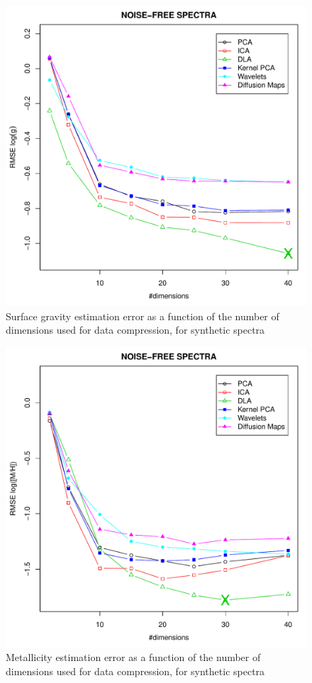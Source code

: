 \documentclass[a4paper,fleqn,usenatbib]{mnras}
\begin{document}
{{{\begin{figure}
\centering\includegraphics[width=\columnwidth]{flamesHR10_SNR=000_Logg_log_BestSVM_N-RMSE_test.pdf}
\caption{Surface gravity estimation error as a function of the number of
  dimensions used for data compression, for synthetic spectra}
\label{fig:03}
\end{figure}

\begin{figure}
\centering\includegraphics[width=\columnwidth]{flamesHR10_SNR=000_Meta_log_BestSVM_N-RMSE_test.pdf}
\caption{Metallicity estimation error as a function of the number of
  dimensions used for data compression, for synthetic spectra}
\label{fig:05}
\end{figure}

}}}
\end{document}

